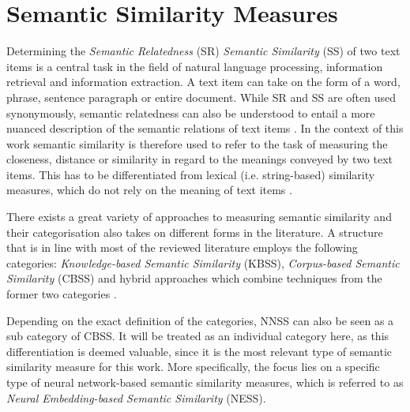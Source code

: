 \documentclass[11pt]{scrreprt}
\let\cite\parencite  %
\begin{document}
\section{Semantic Similarity Measures}
Determining the \textit{Semantic Relatedness} (SR) \textit{Semantic Similarity} (SS) of two text items is a central task in the field of natural language processing, information retrieval and information extraction. A text item can take on the form of a word, phrase, sentence paragraph or entire document. While SR and SS are often used synonymously, semantic relatedness can also be understood to entail a more nuanced description of the semantic relations of text items \cite{chandrasekaranEvolutionSemanticSimilarity2021, harispeSemanticSimilarityNatural2015}.  In the context of this work semantic similarity is therefore used to refer to the task of measuring the closeness, distance or similarity in regard to the meanings conveyed by two text items. This has to be differentiated from lexical (i.e. string-based) similarity measures, which do not rely on the meaning of text items \cite{p.SurveySemanticSimilarity2019}.

There exists a great variety of approaches to measuring semantic similarity and their categorisation also takes on different forms in the literature.
A structure that is in line with most of the reviewed literature employs the following categories: \textit{Knowledge-based Semantic Similarity} (KBSS), \textit{Corpus-based Semantic Similarity} (CBSS) and hybrid approaches which combine techniques from the former two categories
\cite{chandrasekaranEvolutionSemanticSimilarity2021, harispeSemanticSimilarityNatural2015, hanSurveyTechniquesApplications2021, zadSurveyDeepLearning2021}.

Depending on the exact definition of the categories, NNSS can also be seen as a sub category of CBSS. It will be treated as an individual category here, as this differentiation is deemed valuable, since it is the most relevant type of semantic similarity measure for this work. More specifically, the focus lies on a specific type of neural network-based semantic similarity measures, which is referred to as \textit{Neural Embedding-based Semantic Similarity} (NESS). 
\end{document}
